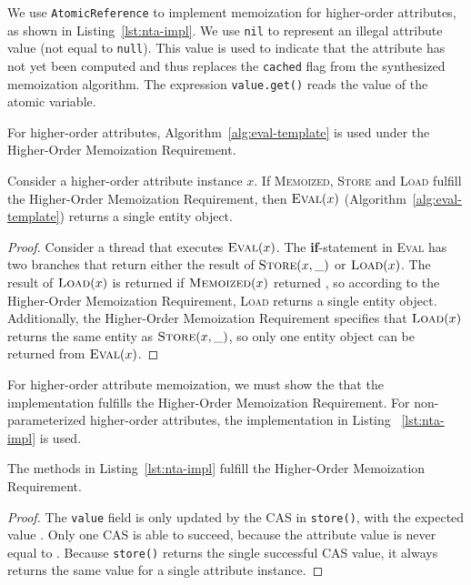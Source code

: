 {We use \verb'AtomicReference' to implement memoization for higher-order attributes,
as shown in Listing~\ref{lst:nta-impl}.  We use \verb'nil' to represent an illegal attribute value
(not equal to \verb'null').
This value is used to indicate that the attribute has not yet been computed and
thus replaces the \verb'cached' flag from the synthesized memoization algorithm. The
expression \verb'value.get()' reads the value of the atomic variable.

For higher-order attributes, Algorithm~\ref{alg:eval-template} is used under
the Higher-Order Memoization Requirement.

\begin{theorem}
  Consider a higher-order attribute instance $x$.
  If \textsc{Memoized}, \textsc{Store} and \textsc{Load}
  fulfill the Higher-Order Memoization Requirement,
  then $\textsc{Eval}(x)$ (Algorithm~\ref{alg:eval-template}) returns a single entity object.

  \label{theorem:nta-eval-sound}
\end{theorem}

\begin{proof}
  Consider a thread that executes $\textsc{Eval}(x)$.
  The \textbf{if}-statement in \textsc{Eval}
  has two branches that return either the result of $\textsc{Store}(x, \_)$ or
  $\textsc{Load}(x)$.
  The result of $\textsc{Load}(x)$ is returned if
  $\textsc{Memoized}(x)$ returned \true{}, so according to the Higher-Order
  Memoization Requirement, \textsc{Load} returns a single entity object.
  Additionally, the Higher-Order Memoization Requirement
  specifies that $\textsc{Load}(x)$ returns the same entity as $\textsc{Store}(x, \_)$,
  so only one entity object can be returned from $\textsc{Eval}(x)$.
\end{proof}

For higher-order attribute memoization, we must show the that the
implementation fulfills the Higher-Order Memoization Requirement. For
non-parameterized higher-order attributes, the implementation in Listing
~\ref{lst:nta-impl} is used.

\begin{theorem}
  The methods in Listing~\ref{lst:nta-impl} fulfill the
  Higher-Order Memoization Requirement.
\end{theorem}

\begin{proof}
  The \verb'value' field is only updated by the CAS in \verb'store()', with
  the expected value \none{}. Only one CAS is able to succeed, because the attribute
  value is never equal to \none{}.  Because \verb'store()' returns the single
  successful CAS value, it always returns the same value for a single attribute instance.


\end{proof}}
